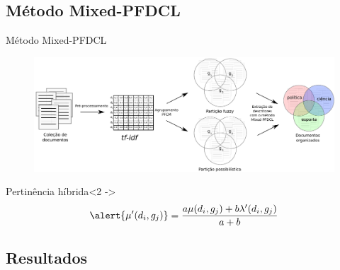 \documentclass[brazil]{beamer}
\begin{document}
\subsection{Método Mixed-PFDCL}
\begin{frame}{Método Mixed-PFDCL}
  \begin{figure}[!htp] 
    \centering
    \includegraphics[width=0.8\columnwidth]{assets/process_pfdcl.pdf} 
  \end{figure}

  \begin{alertblock}{Pertinência híbrida}<2 ->
    \begin{equation}
      \alert{\mu'(d_i,g_j)} = \frac{a \mu(d_i,g_j) + b \lambda'(d_i,g_j)}{a+b}
      \label{eq:pfcmmix}
    \end{equation}
  \end{alertblock}

\end{frame}

\subsection{Resultados}
\end{document}
